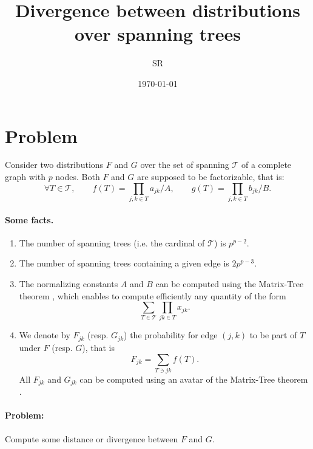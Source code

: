 \documentclass[a4paper, 10pt]{article}
\title{Divergence between distributions over spanning trees}
\author{SR}
\date{\today}
\newcommand{\Tcal}{\mathcal{T}}
\begin{document}

\maketitle

\section{Problem} 

Consider two distributions $F$ and $G$ over the set of spanning $\Tcal$ of a complete graph with $p$ nodes. Both $F$ and $G$ are supposed to be factorizable, that is:
$$
\forall T \in \Tcal, \qquad
f(T) = \prod_{j, k \in T} a_{jk} / A, \qquad
g(T) = \prod_{j, k \in T} b_{jk} / B.
$$

\paragraph{Some facts.}
\begin{enumerate}
 \item The number of spanning trees (i.e. the cardinal of $\Tcal$) is $p^{p-2}$.
 \item The number of spanning trees containing a given edge is $2p^{p-3}$.
 \item The normalizing constants $A$ and $B$ can be computed using the Matrix-Tree theorem \cite{Cha82}, which enables to compute efficiently any quantity of the form
 \begin{equation} \label{eq:MTT}
 \sum_{T \in \Tcal} \prod_{jk \in T} x_{jk}.
 \end{equation}
 \item We denote by $F_{jk}$ (resp. $G_{jk}$) the probability for edge $(j, k)$ to be part of $T$ under $F$ (resp. $G$), that is
 $$
 F_{jk} = \sum_{T \ni jk} f(T).
 $$
 All $F_{jk}$ and $G_{jk}$ can be computed using an avatar of the Matrix-Tree theorem \cite{Kir07}.
\end{enumerate}

\paragraph{Problem:} 
Compute some distance or divergence between $F$ and $G$.

\end{document}
